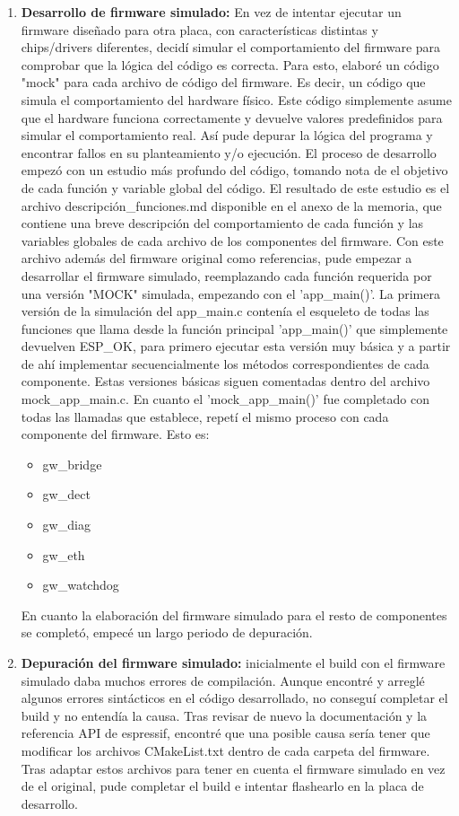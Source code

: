 \documentclass[a4paper,11pt]{article}
\begin{document}
\begin{itemize}
\begin{enumerate}
		\item \textbf{Desarrollo de firmware simulado: } En vez de intentar ejecutar un firmware diseñado para otra placa, con características distintas y chips/drivers diferentes, decidí simular el comportamiento del firmware para comprobar que la lógica del código es correcta. Para esto, elaboré un código "mock" para cada archivo de código del firmware. Es decir, un código que simula el comportamiento del hardware físico. Este código simplemente asume que el hardware funciona correctamente y devuelve valores predefinidos para simular el comportamiento real. Así pude depurar la lógica del programa y encontrar fallos en su planteamiento y/o ejecución. El proceso de desarrollo empezó con un estudio más profundo del código, tomando nota de el objetivo de cada función y variable global del código. El resultado de este estudio es el archivo descripción\_funciones.md disponible en el anexo de la memoria, que contiene una breve descripción del comportamiento de cada función y las variables globales de cada archivo de los componentes del firmware. Con este archivo además del firmware original como referencias, pude empezar a desarrollar el firmware simulado, reemplazando cada función requerida por una versión "MOCK" simulada, empezando con el 'app\_main()'. La primera versión de la simulación del app\_main.c contenía el esqueleto de todas las funciones que llama desde la función principal 'app\_main()' que simplemente devuelven ESP\_OK, para primero ejecutar esta versión muy básica y a partir de ahí implementar secuencialmente los métodos correspondientes de cada componente. Estas versiones básicas siguen comentadas dentro del archivo mock\_app\_main.c. En cuanto el 'mock\_app\_main()' fue completado con todas las llamadas que establece, repetí el mismo proceso con cada componente del firmware. Esto es:
		\begin{itemize}
			\item gw\_bridge
			\item gw\_dect
			\item gw\_diag
			\item gw\_eth
			\item gw\_watchdog
		\end{itemize}
		En cuanto la elaboración del firmware simulado para el resto de componentes se completó, empecé un largo periodo de depuración.
		\item \textbf{Depuración del firmware simulado: } inicialmente el build con el firmware simulado daba muchos errores de compilación. Aunque encontré y arreglé algunos errores sintácticos en el código desarrollado, no conseguí completar el build y no entendía la causa. Tras revisar de nuevo la documentación y la referencia API de espressif, encontré que una posible causa sería tener que modificar los archivos CMakeList.txt dentro de cada carpeta del firmware. Tras adaptar estos archivos para tener en cuenta el firmware simulado en vez de el original, pude completar el build e intentar flashearlo en la placa de desarrollo.

\end{enumerate}
\end{itemize}
\end{document}
